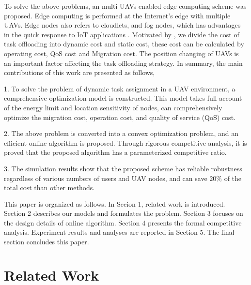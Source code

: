 \documentclass[journal,article,submit,pdftex,moreauthors]{Definitions/mdpi}
\begin{document}
To solve the above problems, an multi-UAVs enabled edge computing scheme was proposed. Edge computing is performed at the Internet's edge with multiple UAVs. Edge  nodes also refers to cloudlets, and fog nodes, which has advantages in the quick response to IoT applications \cite{Wangtian19,Satyanarayanan17}. Motivated by \cite{WANG}, we divide the cost of task offloading into dynamic cost and static cost, these cost can be calculated by operating cost, QoS cost and Migration cost. The position changing of UAVs is an important factor affecting the task offloading strategy. In summary, the main contributions of
this work are presented as follows,


1. To solve the problem of dynamic task assignment in a UAV environment, a comprehensive optimization model is constructed. This model takes full account of the energy limit and location sensitivity of nodes,  can comprehensively optimize the migration cost, operation cost, and quality of service (QoS) cost.


2. The above problem is converted into a convex optimization problem, and an efficient online algorithm is proposed. Through rigorous competitive analysis, it is proved that the proposed algorithm has a parameterized competitive ratio.


3. The simulation results show that the proposed scheme has reliable robustness regardless of various numbers of users and UAV nodes, and can save $20\%$ of the total cost than other methods.






This paper is organized as follows. In Secion 1, related work is introduced. Section 2
describes our models and formulates the problem. Section 3 focuses on the design details of online algorithm. Section 4 presents the formal competitive analysis. Experiment results and analyses are reported in Section 5. The final section concludes this paper.

\section{Related Work}
\end{document}

